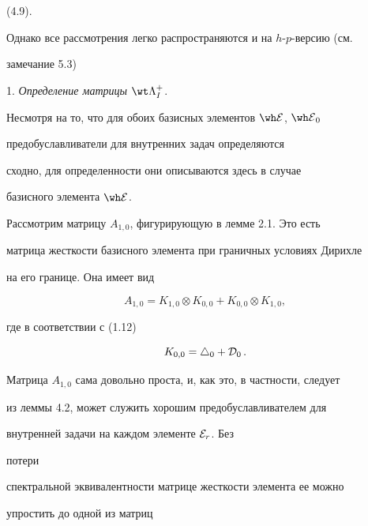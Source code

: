 (4.9). 


Однако все рассмотрения легко распространяются и на $h$-$p$-версию (см. 


замечание 5.3)


 


1. {\it Определение матрицы} $\wt \Lambda^{+}_I$.


Несмотря на то, что для обоих базисных элементов ${\E}$, ${\E}_0$ 


предобуславливатели для внутренних задач определяются 


сходно, для определенности они описываются здесь в случае 


базисного элемента ${\E}$. 





Рассмотрим матрицу $A_{1,0}$, фигурирующую в лемме 2.1. Это есть 


матрица жесткости базисного элемента при граничных условиях Дирихле 


на его границе. Она имеет вид


\begin{equation}


A_{1,0}=K_{1,0}\otimes K_{0,0}+K_{0,0}\otimes K_{1,0},


\label{5.1}


\end{equation} 


где в соответствии с (1.12) 


\begin{equation}


K_{0,0}=\bigtriangleup_{0}+{\cal D}_0\,. 


\end{equation}





Матрица $A_{1,0}$ сама довольно проста, и, как это, в частности, следует 


из леммы 4.2, может служить хорошим предобуславливателем для 


внутренней задачи на каждом элементе ${\cal E}_r$. Без 


потери 


спектральной эквивалентности матрице жесткости элемента ее можно 


упростить до одной из матриц


